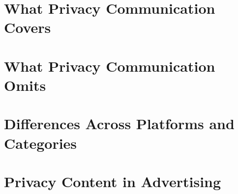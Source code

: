 \section{What Privacy Communication Covers}

\section{What Privacy Communication Omits}

\section{Differences Across Platforms and Categories}

\section{Privacy Content in Advertising}
